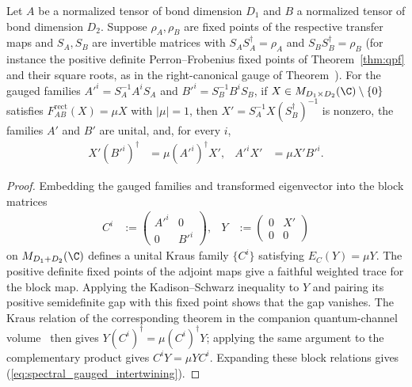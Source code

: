 \begin{lemma}%
    \label{thm:gauged_intertwining_core}
    \leanok
    Let $A$ be a normalized tensor of bond dimension $D_1$ and $B$ a
    normalized tensor of bond dimension $D_2$. Suppose $\rho_A,\rho_B$ are
    fixed points of the respective transfer maps and $S_A,S_B$ are
    invertible matrices with $S_AS_A^\dagger=\rho_A$ and
    $S_BS_B^\dagger=\rho_B$ (for instance the positive definite
    Perron--Frobenius fixed points of Theorem~\ref{thm:qpf} and their
    square roots, as in the right-canonical gauge of
    Theorem~\cite[``Right-canonical (unital) gauge'']{QICLean2026Blueprint}).
    For the gauged families $A'^i=S_A^{-1}A^iS_A$ and
    $B'^i=S_B^{-1}B^iS_B$, if
    $X\in M_{D_1\times D_2}(\C)\setminus\{0\}$ satisfies
    $F_{AB}^{\mathrm{rect}}(X)=\mu X$ with $|\mu|=1$, then
    $X'=S_A^{-1}X(S_B^\dagger)^{-1}$ is nonzero, the families $A'$ and $B'$
    are unital, and, for every $i$,
    \begin{align}
        X'(B'^i)^\dagger
         & =\mu(A'^i)^\dagger X',
         &
        A'^iX'
         & =\mu X'B'^i.
        \label{eq:spectral_gauged_intertwining}
    \end{align}
\end{lemma}

\begin{proof}\leanok
    Embedding the gauged families and transformed eigenvector into the block
    matrices
    \begin{align}
        C^i
         & :=
        \begin{pmatrix}
            A'^i & 0    \\
            0    & B'^i
        \end{pmatrix},
         &
        Y
         & :=
        \begin{pmatrix}
            0 & X' \\
            0 & 0
        \end{pmatrix}
        \label{eq:spectral_block_embedding}
    \end{align}
    on $M_{D_1+D_2}(\C)$ defines a unital Kraus family $\{C^i\}$ satisfying
    $E_C(Y)=\mu Y$. The positive definite fixed points of the adjoint
    maps give a faithful weighted trace for the block map. Applying the
    Kadison--Schwarz inequality to $Y$ and pairing its positive semidefinite
    gap with this fixed point shows that the gap vanishes. The Kraus
    relation of the corresponding theorem in the companion quantum-channel volume~\cite[``KS equality implies Kraus commutation'']{QICLean2026Blueprint} then gives
    $Y(C^i)^\dagger=\mu(C^i)^\dagger Y$; applying the same argument to the
    complementary product gives $C^iY=\mu YC^i$. Expanding these block
    relations gives (\ref{eq:spectral_gauged_intertwining}).
\end{proof}

